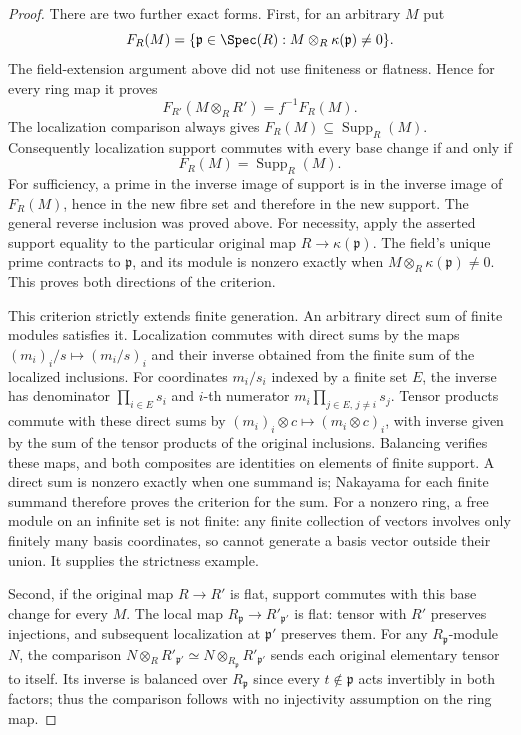\begin{proof}
\medskip\noindent
There are two further exact forms. First, for an arbitrary
$M$ put
$$
F_R(M)=\{\mathfrak p\in\Spec(R):
M\otimes_R\kappa(\mathfrak p)\ne0\}.
$$
The field-extension argument above did not use finiteness
or flatness. Hence for every ring map it proves
$$
F_{R'}(M\otimes_RR')=f^{-1}F_R(M).
$$
The localization comparison always gives
$F_R(M)\subseteq\operatorname{Supp}_R(M)$.
Consequently localization support commutes with every
base change if and only if
$$
F_R(M)=\operatorname{Supp}_R(M).
$$
For sufficiency, a prime in the inverse image of support
is in the inverse image of $F_R(M)$, hence in the new
fibre set and therefore in the new support. The general
reverse inclusion was proved above. For necessity, apply
the asserted support equality to the particular original
map $R\to\kappa(\mathfrak p)$. The field's unique prime
contracts to $\mathfrak p$, and its module is nonzero
exactly when $M\otimes_R\kappa(\mathfrak p)\ne0$.
This proves both directions of the criterion.

This criterion strictly extends finite generation. An
arbitrary direct sum of finite modules satisfies it.
Localization commutes with direct sums by the maps
$(m_i)_i/s\mapsto(m_i/s)_i$ and their inverse obtained
from the finite sum of the localized inclusions.
For coordinates $m_i/s_i$ indexed by a finite set $E$,
the inverse has denominator $\prod_{i\in E}s_i$ and
$i$-th numerator $m_i\prod_{j\in E,\,j\ne i}s_j$.
Tensor products commute with these direct sums by
$(m_i)_i\otimes c\mapsto(m_i\otimes c)_i$, with inverse
given by the sum of the tensor products of the original
inclusions. Balancing verifies these maps, and both
composites are identities on elements of finite support.
A direct sum is nonzero exactly when one summand is;
Nakayama for each finite summand therefore proves the
criterion for the sum. For a nonzero ring, a free module
on an infinite set is not finite: any finite collection
of vectors involves only finitely many basis coordinates,
so cannot generate a basis vector outside their union.
It supplies the strictness example.

\medskip\noindent
Second, if the original map $R\to R'$ is flat, support
commutes with this base change for every $M$. The local
map $R_{\mathfrak p}\to R'_{\mathfrak p'}$ is flat:
tensor with $R'$ preserves injections, and subsequent
localization at $\mathfrak p'$ preserves them. For any
$R_{\mathfrak p}$-module $N$, the comparison
$N\otimes_RR'_{\mathfrak p'}\simeq
N\otimes_{R_{\mathfrak p}}R'_{\mathfrak p'}$
sends each original elementary tensor to itself.
Its inverse is balanced over $R_{\mathfrak p}$ since
every $t\notin\mathfrak p$ acts invertibly in both factors;
thus the comparison follows with no injectivity assumption
on the ring map.


\end{proof}
